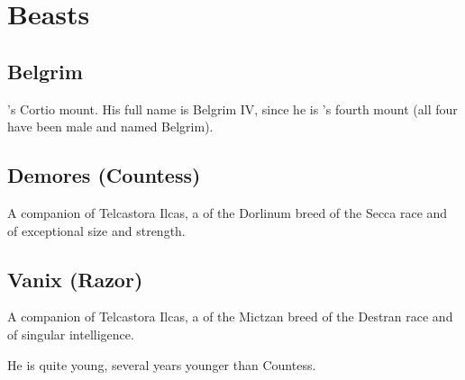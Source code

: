 \chapter{Beasts}















\section{Belgrim}
\Narkiza's Cortio mount. His full name is Belgrim IV, since he is \Narkiza's fourth mount (all four have been male and named Belgrim). 















\section{Demores (Countess)}
A companion of Telcastora Ilcas, a \nycan{} of the Dorlinum breed of the Secca race and of exceptional size and strength.



















\section{Vanix (Razor)}
A companion of Telcastora Ilcas, a \nycan{} of the Mictzan breed of the Destran race and of singular intelligence. 

He is quite young, several years younger than Countess. 









